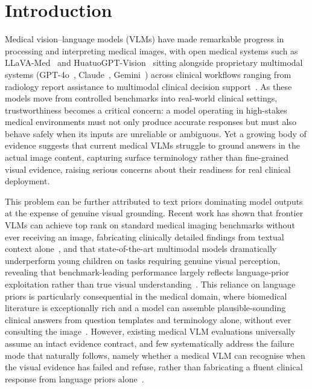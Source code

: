 \documentclass{article}
\begin{document}
\section{Introduction}
\label{sec:introduction}

Medical vision--language models (VLMs) have made remarkable progress in processing and interpreting medical images, with open medical systems such as LLaVA-Med~\cite{li2023llavamed} and HuatuoGPT-Vision~\cite{chen2024huatuogptvision} sitting alongside proprietary multimodal systems (GPT-4o~\cite{openai2024gpt4o}, Claude~\cite{anthropic2024claude3}, Gemini~\cite{gemini2023technical}) across clinical workflows ranging from radiology report assistance to multimodal clinical decision support~\cite{moor2023medflamingo,wu2023radfm}. As these models move from controlled benchmarks into real-world clinical settings, trustworthiness becomes a critical concern: a model operating in high-stakes medical environments must not only produce accurate responses but must also behave safely when its inputs are unreliable or ambiguous. Yet a growing body of evidence suggests that current medical VLMs struggle to ground answers in the actual image content, capturing surface terminology rather than fine-grained visual evidence, raising serious concerns about their readiness for real clinical deployment.

This problem can be further attributed to text priors dominating model outputs at the expense of genuine visual grounding. Recent work has shown that frontier VLMs can achieve top rank on standard medical imaging benchmarks without ever receiving an image, fabricating clinically detailed findings from textual context alone~\cite{asadi2026mirageillusionvisualunderstanding}, and that state-of-the-art multimodal models dramatically underperform young children on tasks requiring genuine visual perception, revealing that benchmark-leading performance largely reflects language-prior exploitation rather than true visual understanding~\cite{chen2026babyvision}. This reliance on language priors is particularly consequential in the medical domain, where biomedical literature is exceptionally rich and a model can assemble plausible-sounding clinical answers from question templates and terminology alone, without ever consulting the image~\cite{goyal2017vqa,agarwal2020causalvqa}. However, existing medical VLM evaluations universally assume an intact evidence contract, and few systematically address the failure mode that naturally follows, namely whether a medical VLM can recognise when the visual evidence has failed and refuse, rather than fabricating a fluent clinical response from language priors alone~\cite{lau2018vqarad,liu2021slake,zhang2023pmcvqa,li2023pope,rohrbach2018chair,chen2024medihallv1,geifman2017selective,ren2023selfevaluation,singhal2023medpalm}.
\end{document}

